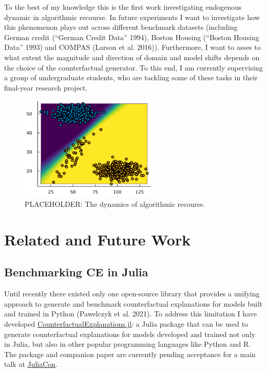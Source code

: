 \documentclass[
]{acmconf}
\begin{document}
To the best of my knowledge this is the first work investigating
endogenous dynamic in algorithmic recourse. In future experiments I want
to investigate how this phenomenon plays out across different benchmark
datasets (including German credit ({``German Credit Data''} 1994),
Boston Housing ({``Boston Housing Data''} 1993) and COMPAS (Larson et
al. 2016)). Furthermore, I want to asses to what extent the magnitude
and direction of domain and model shifts depends on the choice of the
counterfactual generator. To this end, I am currently supervising a
group of undergraduate students, who are tackling some of these tasks in
their final-year research project.

\begin{figure}

{\centering \includegraphics[width=2.60417in,height=\textheight]{www/dynamics.png}

}

\caption{\label{fig-dynamics}PLACEHOLDER: The dynamics of algorithmic
recourse.}

\end{figure}

\hypertarget{sec-related}{%
\section{Related and Future Work}\label{sec-related}}

\hypertarget{benchmarking-ce-in-julia}{%
\subsection{Benchmarking CE in Julia}\label{benchmarking-ce-in-julia}}

Until recently there existed only one open-source library that provides
a unifying approach to generate and benchmark counterfactual
explanations for models built and trained in Python (Pawelczyk et al.
2021). To address this limitation I have developed
\href{https://www.paltmeyer.com/CounterfactualExplanations.jl/stable/}{CounterfactualExplanations.jl}:
a Julia package that can be used to generate counterfactual explanations
for models developed and trained not only in Julia, but also in other
popular programming languages like Python and R. The package and
companion paper are currently pending acceptance for a main talk at
\href{https://juliacon.org/2022/}{JuliaCon}.
\end{document}
